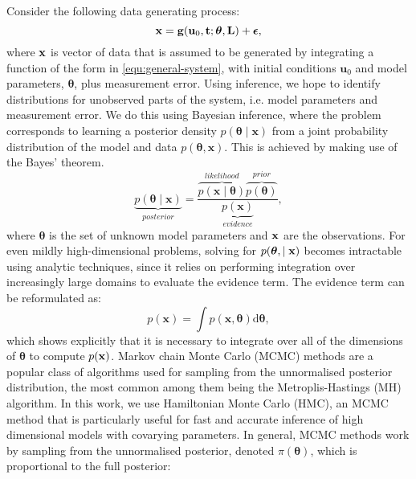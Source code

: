 Consider the following data generating process:
\begin{equation}\label{eqn:general-forward-model}
    \mathbf{x} =  \mathbf{g}(\mathbf{u}_0,  \mathbf{t}; \boldsymbol{\theta}, \mathbf{L}) + \boldsymbol{\epsilon}, 
\end{equation}
where $\mathbf{x}$ is vector of data that is assumed to be generated by integrating
a function of the form in \cref{equ:general-system}, with initial conditions
$\mathbf{u}_0$ and model parameters, $\boldsymbol{\theta}$, plus measurement
error. Using inference, we hope to identify distributions for unobserved parts
of the system, i.e. model parameters and measurement error. We do this using
Bayesian inference, where the problem corresponds to learning a posterior
density  
$p(\boldsymbol\theta \mid \mathbf{x})$ from a joint probability distribution of
the model and data $p(\boldsymbol\theta , \mathbf{x})$. This is achieved by
making use of the Bayes' theorem.
\begin{equation}\label{eqn:bayesrule}
    \underbrace{p(\boldsymbol{\theta} \mid \mathbf{x})}_{posterior} = 
    \frac{\overbrace{p(\mathbf{x} \mid \boldsymbol{\theta})}^{likelihood}
    \overbrace{p(\boldsymbol{\theta})}^{prior}}
    {\underbrace{p(\mathbf{x})}_{evidence}},
\end{equation}
where $\boldsymbol{\theta}$ is the set of unknown model parameters and $\mathbf{x}$
are the observations. For even mildly high-dimensional problems, solving for
$p(\boldsymbol\theta, \mid \mathbf{x})$ becomes intractable using analytic
techniques, since it relies on performing integration over increasingly large
domains to evaluate the evidence term. The evidence term can be reformulated as: 
\begin{equation}
    {p(\mathbf{x})} = \int p(\mathbf{x} , \mathbf{\boldsymbol{\theta}}) \mathrm{d}\mathbf{\boldsymbol{\theta}},
\end{equation}
which shows explicitly that it is necessary to integrate over all of the
dimensions of $\boldsymbol{\theta}$ to compute $p(\mathbf{x})$. Markov chain Monte
Carlo (MCMC) methods are a popular class of algorithms used for sampling from
the unnormalised posterior distribution, the most common among them being the
Metroplis-Hastings (MH) algorithm. In this work, we use Hamiltonian Monte Carlo
(HMC), an MCMC method that is particularly useful for fast and accurate
inference of high dimensional models with covarying parameters. In general, 
MCMC methods work by sampling from the unnormalised posterior,
denoted $\pi(\boldsymbol\theta)$, which is proportional to the full posterior: 
